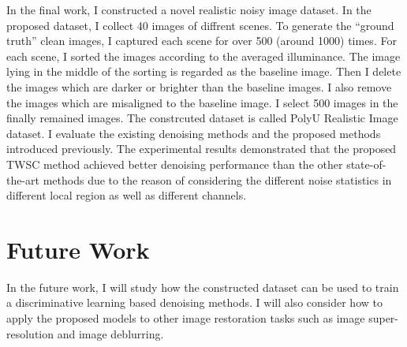In the final work, I constructed a novel realistic noisy image dataset. In the proposed dataset, I collect 40 images of diffrent scenes. To generate the ``ground truth'' clean images, I captured each scene for over 500 (around 1000) times. For each scene, I sorted the images according to the averaged illuminance. The image lying in the middle of the sorting is regarded as the baseline image. Then I delete the images which are darker or brighter than the baseline images. I also remove the images which are misaligned to the baseline image. I select 500 images in the finally remained images. The constrcuted dataset is called PolyU Realistic Image dataset. I evaluate the existing denoising methods and the proposed methods introduced previously. The experimental results demonstrated that the proposed TWSC method achieved better denoising performance than the other state-of-the-art methods due to the reason of considering the different noise statistics in different local region as well as different channels.



\section{Future Work}
\label{sec:conclusions:future}

In the future work, I will study how the constructed dataset can be used to train a discriminative learning based denoising methods. I will also consider how to apply the proposed models to other image restoration tasks such as image super-resolution and image deblurring.
